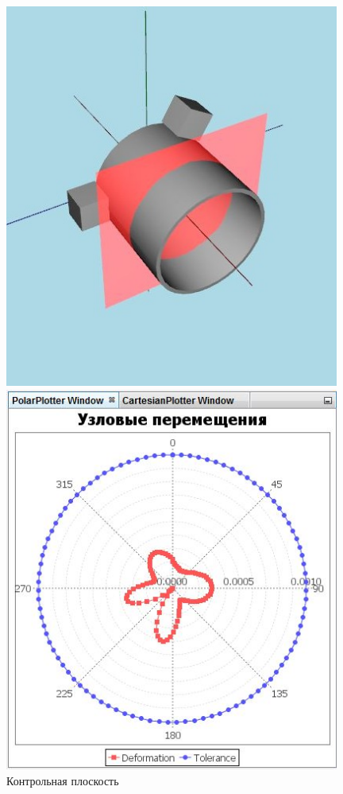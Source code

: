 \documentclass[14pt,oneside,final]{extreport}
\begin{document}
	\begin{figure}[b!]
		\centering	
		\noindent
		\begin{minipage}[b!]{0.5\textwidth}
			\includegraphics[width=0.98\textwidth]{img/viewport-screen2} 
			\caption{Контрольная плоскость}
			\label{fig:viewport-screen2}
		\end{minipage}%
		\begin{minipage}[b!]{0.5\textwidth}
			\includegraphics[width=0.98\textwidth]{img/graph-screen} 

\end{minipage}
\end{figure}
\end{document}
